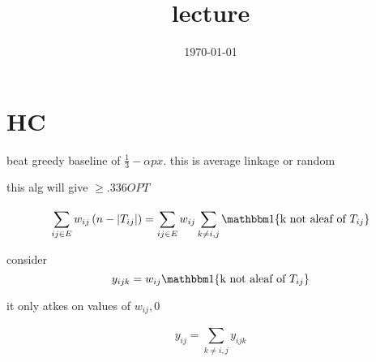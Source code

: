 \documentclass{article}
\title{lecture}
\date{\today}
\theoremstyle{definition}
\newcommand{\abs}[1]{\left| #1 \right|}
\begin{document}
\maketitle


\section{HC}

beat greedy baseline of \(\frac{1}{3}-\alpha px\). this is average linkage or random

this alg will give \(\geq .336 OPT\)

\begin{equation}
    \sum_{ij\in E}^{}w_{ij}\left( n-\abs{T_{ij}} \right)=\sum_{ij\in E}^{}w_{ij}\sum_{k\neq i,j}^{}\mathbbm 1 \{\text{k not  aleaf of $T_{ij}$}\}
\end{equation}


consider
\begin{equation}
    y_{ijk} = w_{ij}\mathbbm 1 \{\text{k not  aleaf of $T_{ij}$}\}
\end{equation}

it only atkes on values of \(w_{ij},0\)


\begin{equation}
    y_{ij} = \sum_{k\neq i,j}^{}y_{ijk}
\end{equation}
\end{document}
